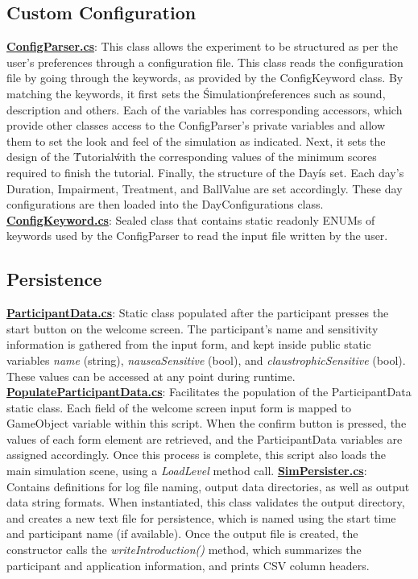 \documentclass{article}
\begin{document}
\subsection{Custom Configuration} 
\href{https://bit.ly/2TZaLYj}{\textbf{ConfigParser.cs}}: This class allows the experiment to be structured as per the user's preferences through a configuration file. This class reads the configuration file by going through the keywords, as provided by the ConfigKeyword class. By matching the keywords, it first sets the \'Simulation\' preferences such as sound, description and others. Each of the variables has corresponding accessors, which provide other classes access to the ConfigParser's private variables and allow them to set the look and feel of the simulation as indicated. Next, it sets the design of the \'Tutorial\' with the corresponding values of the minimum scores required to finish the tutorial. Finally, the structure of the \'Day\' is set. Each day's Duration, Impairment, Treatment, and BallValue are set accordingly. These day configurations are then loaded into the DayConfigurations class.
\href{https://bit.ly/2TWgOwJ}{\textbf{ConfigKeyword.cs}}: Sealed class that contains static readonly ENUMs of keywords used by the ConfigParser to read the input file written by the user. 



\subsection{Persistence} %
\href{https://bit.ly/2Fhq8B2}{\textbf{ParticipantData.cs}}: Static class populated after the participant presses the start button on the welcome screen. The participant's name and sensitivity information is gathered from the input form, and kept inside public static variables \textit{name} (string), \textit{nauseaSensitive} (bool), and \textit{claustrophicSensitive} (bool). These values can be accessed at any point during runtime. \newline \newline
\href{https://bit.ly/2WgL6qR}{\textbf{PopulateParticipantData.cs}}: Facilitates the population of the ParticipantData static class. Each field of the welcome screen input form is mapped to GameObject variable within this script. When the confirm button is pressed, the values of each form element are retrieved, and the ParticipantData variables are assigned accordingly. Once this process is complete, this script also loads the main simulation scene, using a \textit{LoadLevel} method call. \newline \newline
\href{https://bit.ly/2OdbwH6}{\textbf{SimPersister.cs}}: Contains definitions for log file naming, output data directories, as well as output data string formats. When instantiated, this class validates the output directory, and creates a new text file for persistence, which is named using the start time and participant name (if available). Once the output file is created, the constructor calls the \textit{writeIntroduction()} method, which summarizes the participant and application information, and prints CSV column headers.
\end{document}
